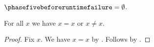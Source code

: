 \begin{definition}\label{phase5_before_runtime_failure}
    $\phasefivebeforeruntimefailure = \emptyset$.
\end{definition}

\begin{proposition}\label{phase5_runtime_failure}
    For all $x$ we have $x = x$ or $x \neq x$.
\end{proposition}
\begin{proof}
    Fix $x$.
    We have $x = x$ by \auto.
    Follows by \auto.
\end{proof}
